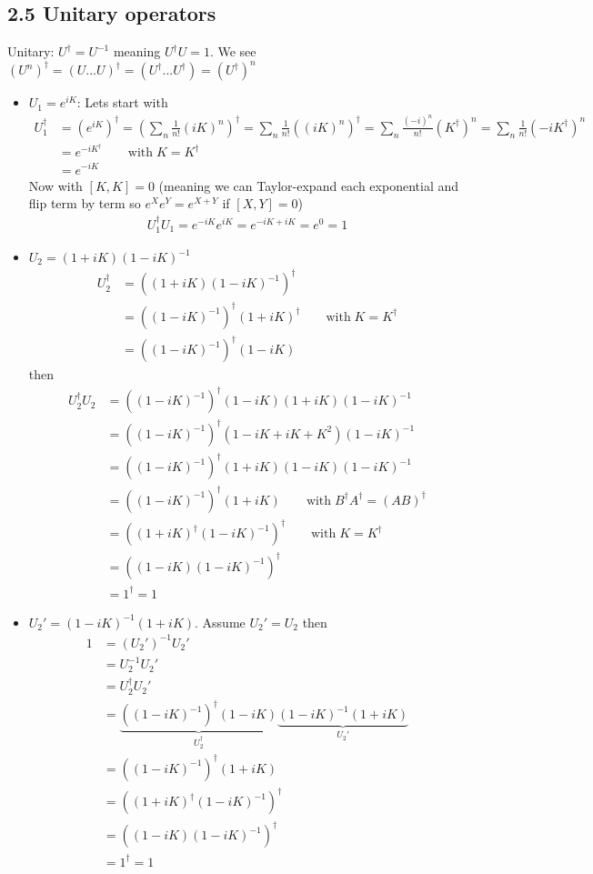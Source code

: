 \documentclass[10pt,a4paper]{book}
\theoremstyle{definition}
\begin{document}
\subsection{2.5 Unitary operators}
Unitary: $U^\dagger=U^{-1}$ meaning $U^\dagger U=1$. We see $(U^n)^\dagger=(U...U)^\dagger=(U^\dagger ...U^\dagger)=(U^\dagger)^n$
\begin{itemize}
\item $U_1=e^{iK}$: Lets start with
\begin{align}
U_1^\dagger
&=\left(e^{iK}\right)^\dagger
=\left(\sum_n\frac{1}{n!}(iK)^n\right)^\dagger
=\sum_n\frac{1}{n!}\left((iK)^n\right)^\dagger
=\sum_n\frac{(-i)^n}{n!}(K^\dagger)^n
=\sum_n\frac{1}{n!}(-iK^\dagger)^n\\
&=e^{-iK^\dagger}\qquad \text{with}\;K=K^\dagger\\
&=e^{-iK}
\end{align}
Now with $[K,K]=0$ (meaning we can Taylor-expand each exponential and flip term by term so $e^Xe^Y=e^{X+Y}$ if $[X,Y]=0$)
\begin{align}
U_1^\dagger U_1=e^{-iK}e^{iK}=e^{-iK+iK}=e^0=1
\end{align}

\item $U_2=(1+iK)(1-iK)^{-1}$
\begin{align}
U_2^\dagger&=\left((1+iK)(1-iK)^{-1}\right)^\dagger\\
&=\left((1-iK)^{-1}\right)^\dagger(1+iK)^\dagger\qquad\text{with}\;K=K^\dagger\\
&=\left((1-iK)^{-1}\right)^\dagger(1-iK)
\end{align}
then
\begin{align}
U_2^\dagger U_2
&=\left((1-iK)^{-1}\right)^\dagger(1-iK)(1+iK)(1-iK)^{-1}\\
&=\left((1-iK)^{-1}\right)^\dagger(1-iK+iK+K^2)(1-iK)^{-1}\\
&=\left((1-iK)^{-1}\right)^\dagger(1+iK)(1-iK)(1-iK)^{-1}\\
&=\left((1-iK)^{-1}\right)^\dagger(1+iK)\qquad\text{with}\;B^\dagger A^\dagger=(AB)^\dagger\\
&=\left((1+iK)^\dagger(1-iK)^{-1} \right)^\dagger\qquad\text{with}\;K=K^\dagger\\
&=\left((1-iK)(1-iK)^{-1} \right)^\dagger\\
&=1^\dagger=1
\end{align}

\item $U_2'=(1-iK)^{-1}(1+iK)$. Assume $U_2'=U_2$ then
\begin{align}
1&=(U_2')^{-1}U_2'\\
&=U_2^{-1} U_2'\\
&=U_2^\dagger U_2'\\
&=\underbrace{\left((1-iK)^{-1}\right)^\dagger(1-iK)}_{U_2^\dagger}\underbrace{(1-iK)^{-1}(1+iK)}_{U_2'}\\
&=\left((1-iK)^{-1}\right)^\dagger(1+iK)\\
&=\left((1+iK)^\dagger(1-iK)^{-1}\right)^\dagger\\
&=\left((1-iK)(1-iK)^{-1}\right)^\dagger\\
&=1^\dagger=1
\end{align}
\end{itemize}
\end{document}
